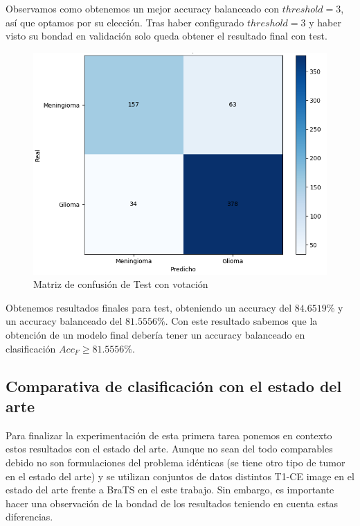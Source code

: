 Observamos como obtenemos un mejor accuracy balanceado con $threshold = 3$, así que optamos por su elección.
Tras haber configurado $threshold = 3$ y haber visto su bondad en validación solo queda obtener el resultado final con test.

\begin{figure}[H]
	\centering
	\includegraphics[width=0.8\linewidth]{imagenes/task1_test.png}
	\caption{Matriz de confusión de Test con votación}
\end{figure}

Obtenemos resultados finales para test, obteniendo un accuracy del $84.6519 \%$ y un accuracy balanceado del $81.5556 \%$. Con este resultado sabemos que la obtención de un modelo final debería tener un accuracy balanceado en clasificación $ Acc_{F} \geq 81.5556 \% $.

\subsection{Comparativa de clasificación con el estado del arte}

Para finalizar la experimentación de esta primera tarea ponemos en contexto estos resultados con el estado del arte. Aunque no sean del todo comparables debido no son formulaciones del problema idénticas (se tiene otro tipo de tumor en el estado del arte) y se utilizan conjuntos de datos distintos T1-CE image en el estado del arte frente a BraTS en el este trabajo. Sin embargo, es importante hacer una observación de la bondad de los resultados teniendo en cuenta estas diferencias. 

